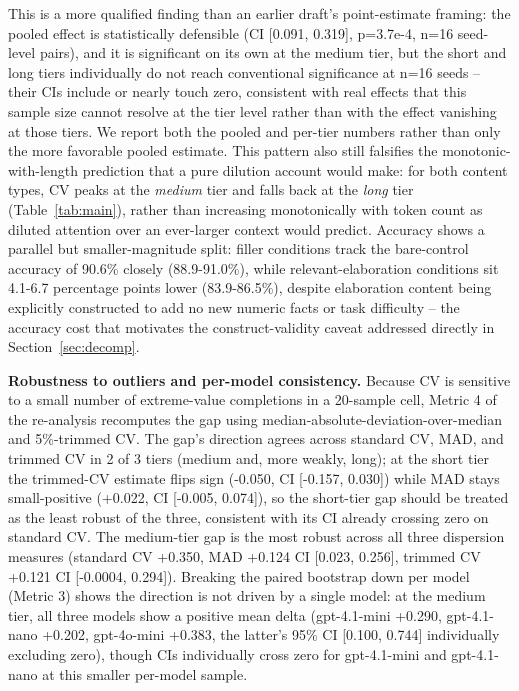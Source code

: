 \documentclass[11pt,letterpaper]{article}
\begin{document}
This is a more qualified finding than an earlier draft's point-estimate framing: the pooled effect is statistically defensible (CI [0.091, 0.319], p=3.7e-4, n=16 seed-level pairs), and it is significant on its own at the medium tier, but the short and long tiers individually do not reach conventional significance at n=16 seeds -- their CIs include or nearly touch zero, consistent with real effects that this sample size cannot resolve at the tier level rather than with the effect vanishing at those tiers. We report both the pooled and per-tier numbers rather than only the more favorable pooled estimate. This pattern also still falsifies the monotonic-with-length prediction that a pure dilution account would make: for both content types, CV peaks at the \emph{medium} tier and falls back at the \emph{long} tier (Table~\ref{tab:main}), rather than increasing monotonically with token count as diluted attention over an ever-larger context would predict. Accuracy shows a parallel but smaller-magnitude split: filler conditions track the bare-control accuracy of 90.6\% closely (88.9-91.0\%), while relevant-elaboration conditions sit 4.1-6.7 percentage points lower (83.9-86.5\%), despite elaboration content being explicitly constructed to add no new numeric facts or task difficulty -- the accuracy cost that motivates the construct-validity caveat addressed directly in Section~\ref{sec:decomp}.

\textbf{Robustness to outliers and per-model consistency.} Because CV is sensitive to a small number of extreme-value completions in a 20-sample cell, Metric 4 of the re-analysis recomputes the gap using median-absolute-deviation-over-median and 5\%-trimmed CV. The gap's direction agrees across standard CV, MAD, and trimmed CV in 2 of 3 tiers (medium and, more weakly, long); at the short tier the trimmed-CV estimate flips sign (-0.050, CI [-0.157, 0.030]) while MAD stays small-positive (+0.022, CI [-0.005, 0.074]), so the short-tier gap should be treated as the least robust of the three, consistent with its CI already crossing zero on standard CV. The medium-tier gap is the most robust across all three dispersion measures (standard CV +0.350, MAD +0.124 CI [0.023, 0.256], trimmed CV +0.121 CI [-0.0004, 0.294]). Breaking the paired bootstrap down per model (Metric 3) shows the direction is not driven by a single model: at the medium tier, all three models show a positive mean delta (gpt-4.1-mini +0.290, gpt-4.1-nano +0.202, gpt-4o-mini +0.383, the latter's 95\% CI [0.100, 0.744] individually excluding zero), though CIs individually cross zero for gpt-4.1-mini and gpt-4.1-nano at this smaller per-model sample.
\end{document}
